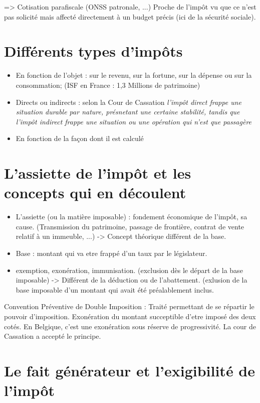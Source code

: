 \documentclass{book}
\begin{document}
=> Cotisation parafiscale (ONSS patronale, ...) Proche de l'impôt vu que ce n'est pas solicité mais affecté directement à un budget précis (ici de la sécurité sociale).

\section{Différents types d'impôts}


\begin{itemize}
\item En fonction de l'objet : sur le revenu, sur la fortune, sur la dépense ou sur la consommation; (ISF en France : 1,3 Millions de patrimoine)
\item Directs ou indirects : selon la Cour de Cassation \textit{l'impôt direct frappe une situation durable par nature, présnetant une certaine stabilité, tandis que l'impôt indirect frappe une situation ou une opération qui n'est que passagère}
\item En fonction de la façon dont il est calculé

\end{itemize}

\section{L'assiette de l'impôt et les concepts qui en découlent}

\begin{itemize}
\item L'assiette (ou la matière imposable) : fondement économique de l'impôt, sa cause. (Transmission du patrimoine, passage de frontière, contrat de vente relatif à un immeuble, ...) -> Concept théorique différent de la base.
\item Base : montant qui va etre frappé d'un taux par le législateur.
\item exemption, exonération, immunisation. (exclusion dès le départ de la base imposable) -> Différent de la déduction ou de l'abattement. (exlusion de la base imposable d'un montant qui avait été préalablement inclus.
\end{itemize}

Convention Préventive de Double Imposition : Traité permettant de se répartir le pouvoir d'imposition. Exonération du montant succeptible d'etre imposé des deux cotés. En Belgique, c'est une exonération sous réserve de progressivité. La cour de Cassation a accepté le principe.

\section{Le fait générateur et l'exigibilité de l'impôt}
\end{document}
